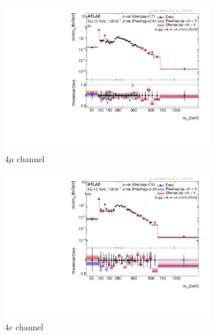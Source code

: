 \begin{figure}[htb!]
    \begin{subfigure}{.49\textwidth}\centering
      \includegraphics[width=.99\linewidth]{Figures/m4l/UnfoldedResults/linlog_Unfolded_Data_m4l_event_type4mu.pdf}\caption{$4\mu$ channel}\label{fig:sub-first}
    \end{subfigure}
    \begin{subfigure}{.49\textwidth}\centering
      \includegraphics[width=.99\linewidth]{Figures/m4l/UnfoldedResults/linlog_Unfolded_Data_m4l_event_type4e.pdf} \caption{$4e$ channel}\label{fig:sub-second}
    \end{subfigure}
    \begin{subfigure}{.49\textwidth}\centering

\end{subfigure}
\end{figure}
